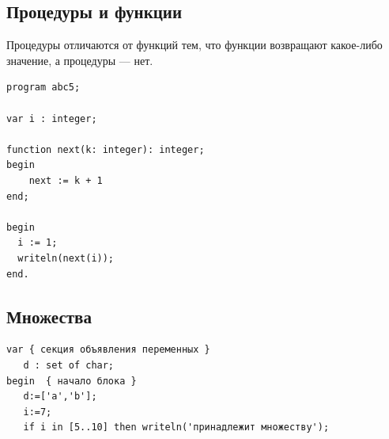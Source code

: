 \documentclass[unicode, 12pt, a4paper,oneside,fleqn]{article}
\begin{document}
\subsection{Процедуры и функции}
Процедуры отличаются от функций тем, что функции возвращают какое-либо
значение, а процедуры — нет.

\begin{verbatim}
program abc5;

var i : integer;

function next(k: integer): integer;
begin
    next := k + 1
end;
 
begin
  i := 1;
  writeln(next(i));
end.
\end{verbatim}

\subsection{Множества}
\begin{verbatim}
var { секция объявления переменных }
   d : set of char;
begin  { начало блока }
   d:=['a','b']; 
   i:=7;
   if i in [5..10] then writeln('принадлежит множеству');
\end{verbatim}
\end{document}

